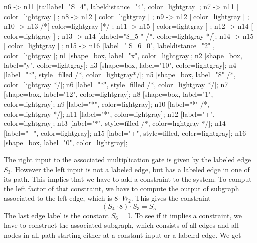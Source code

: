 \begin{example}
\begin{center}
{	n6 -> n11 [taillabel="S_4", labeldistance="4", color=lightgray ];
	n7 -> n11 [ color=lightgray ] ;
	n8 -> n12 [ color=lightgray ] ;
	n9 -> n12 [ color=lightgray ] ;
	n10 -> n13 /*[ color=lightgray ]*/ ; 
	n11 -> n15 [ color=lightgray ] ;
	n12 -> n14 [ color=lightgray ] ;	
	n13 -> n14 [xlabel="S_5  "  /*, color=lightgray */];
	n14 -> n15 [ color=lightgray ] ;
	n15 -> n16 [label="  S_6=0", labeldistance="2" , color=lightgray ];
	n1 [shape=box, label="x", color=lightgray];
	n2 [shape=box, label="y", color=lightgray];
	n3 [shape=box, label="10", color=lightgray];
	n4 [label="*", style=filled /*, color=lightgray*/];
	n5 [shape=box, label="8" /*, color=lightgray */];
	n6 [label="*", style=filled /*, color=lightgray */];
	n7 [shape=box, label="12", color=lightgray];
	n8 [shape=box, label="1", color=lightgray];
	n9 [label="*", color=lightgray];
	n10 [label="*" /*, color=lightgray */];
	n11 [label="*", color=lightgray];	
	n12 [label="+", color=lightgray];	
	n13 [label="*", style=filled /*, color=lightgray */];
	n14 [label="+", color=lightgray];
	n15 [label="+", style=filled, color=lightgray];
	n16 [shape=box, label="0", color=lightgray];		
}
\end{center}
The right input to the associated multiplication gate is given by the labeled edge $S_3$. However the left input is not a labeled edge, but has a labeled edge in one of its path. This implies that we have to add a constraint to the system. To comput the left factor of that constraint, we have to compute the output of subgraph associated to the left edge, which is $8\cdot W_2$. This gives the constraint
$$
(S_4 \cdot 8) \cdot S_3 = S_5
$$ 
The last edge label is the constant $S_6=0$. To see if it implies a constraint, we have to construct the associated subgraph, which consists of all edges and all nodes in all path starting either at a constant input or a labeled edge. We get
\begin{center}
\end{center}
\end{example}
